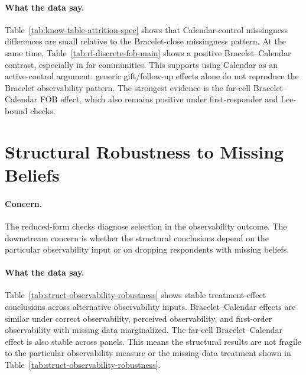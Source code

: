 \documentclass[11pt]{article}
\begin{document}
\begin{table}[!htbp]
\centering
\caption{Main reduced-form FOB effects}
\label{tab:rf-discrete-fob-main}

\end{table}
\FloatBarrier

\paragraph{What the data say.}
Table~\ref{tab:know-table-attrition-spec} shows that Calendar-control missingness differences are small relative to the Bracelet-close missingness pattern. At the same time, Table~\ref{tab:rf-discrete-fob-main} shows a positive Bracelet--Calendar contrast, especially in far communities. This supports using Calendar as an active-control argument: generic gift/follow-up effects alone do not reproduce the Bracelet observability pattern. The strongest evidence is the far-cell Bracelet--Calendar FOB effect, which also remains positive under first-responder and Lee-bound checks.

\section{Structural Robustness to Missing Beliefs}

\paragraph{Concern.}
The reduced-form checks diagnose selection in the observability outcome. The downstream concern is whether the structural conclusions depend on the particular observability input or on dropping respondents with missing beliefs.

\begin{table}[p]
\centering
\caption{Structural treatment-effect robustness to alternative observability inputs}
\label{tab:struct-observability-robustness}
\scriptsize

\end{table}
\FloatBarrier

\paragraph{What the data say.}
Table~\ref{tab:struct-observability-robustness} shows stable treatment-effect conclusions across alternative observability inputs. Bracelet--Calendar effects are similar under correct observability, perceived observability, and first-order observability with missing data marginalized. The far-cell Bracelet--Calendar effect is also stable across panels. This means the structural results are not fragile to the particular observability measure or the missing-data treatment shown in Table~\ref{tab:struct-observability-robustness}.
\end{document}
